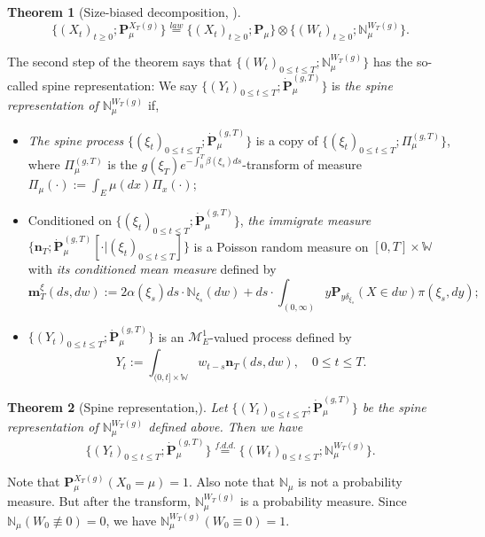 \documentclass[12pt, a4paper]{amsart}
\newtheorem{thm}{Theorem}[section]
\theoremstyle{definition}
\numberwithin{equation}{section}
\begin{document}
\begin{thm}[Size-biased decomposition,  \cite{RenSongSun2017Spine}]\label{thm: size-biased decomposition}
\[
	\{(X_t)_{t\geq 0}; \mathbf P_\mu^{X_T(g)}\}
	\overset{law}{=} \{(X_t)_{t\geq 0}; \mathbf P_\mu \} \otimes \{(W_t)_{t\geq 0}; \mathbb N^{W_T(g)}_\mu\}.
\]
\end{thm}
	The second step of the theorem says that $\{(W_t)_{0\leq t\leq T}; \mathbb N^{W_T(g)}_\mu\}$ has the so-called spine representation:
	We say $\{(Y_t)_{ 0\leq t\leq T}; \dot {\mathbf P}^{(g,T)}_\mu\}$ is \emph{the spine representation of $\mathbb N^{W_T(g)}_\mu$}  if,
\begin{itemize}
\item
	\emph{The spine process} $\{(\xi_t)_{0\leq t\leq T}; \dot{\mathbf P}^{(g,T)}_\mu\}$ is a copy of $\{(\xi_t)_{0\leq t\leq T}; \Pi^{(g,T)}_{\mu}\}$, where $\Pi^{(g,T)}_{\mu}$ is the $g(\xi_T) e^{-\int_0^T \beta(\xi_s)ds}$-transform of measure $\Pi_{\mu}(\cdot):=\int_{E}\mu(dx)\Pi_x(\cdot) $;
\item
	Conditioned on $\{(\xi_t)_{0\leq t\leq T}; \dot{\mathbf P}^{(g,T)}_\mu\}$, \emph{the immigrate measure} $\{\mathbf n_T; \dot{\mathbf P}^{(g,T)}_\mu[\cdot |(\xi_t)_{0\leq t\leq T}]\}$ is a Poisson random measure on $[0,T] \times \mathbb W$ with \emph{its conditioned mean measure} defined by
\[
	\mathbf m^\xi_T(ds,dw)
	:= 2 \alpha(\xi_s) ds \cdot \mathbb N_{\xi_s}(dw) + ds \cdot \int_{(0,\infty)} y \mathbf P_{y\delta_{\xi_s}}(X\in dw) \pi(\xi_s,dy);
\]
\item
	$\{(Y_t)_{0\leq t\leq T}; \dot{\mathbf P}^{(g,T)}_\mu\}$ is an $\mathcal M^1_E$-valued process defined by
\[
	Y_t
	:= \int_{(0,t] \times \mathbb W} w_{t-s} \mathbf n_T(ds,dw),
	\quad 0 \leq t\leq T.
\]
\end{itemize}

\begin{thm}[Spine representation,\cite{RenSongSun2017Spine}]\label{thm: spine representation}
	Let $\{(Y_t)_{0\leq t\leq T}; \dot {\mathbf P}^{(g,T)}_\mu\}$ be the spine representation of $\mathbb N^{W_T(g)}_\mu$ defined above.
	Then we have
\[
	\{(Y_t)_{0\leq t\leq T}; \dot{\mathbf P}^{(g,T)}_\mu\}
	\overset{f.d.d.}{=} \{(W_t)_{0\leq t\leq T}; \mathbb N_\mu^{W_T(g)}\}.
\]
\end{thm}

Note that
		$\mathbf P^{X_T(g)}_\mu(X_0 = \mu) = 1$.
Also note that  $\mathbb N_\mu$ is not a probability measure.
	But after the transform, $\mathbb N^{W_T(g)}_\mu$ is a probability measure.
	Since $\mathbb N_{\mu}(W_0 \not \equiv 0) = 0$, we have $\mathbb N_\mu^{W_T(g)}(W_0 \equiv 0) = 1$.
\end{document}
